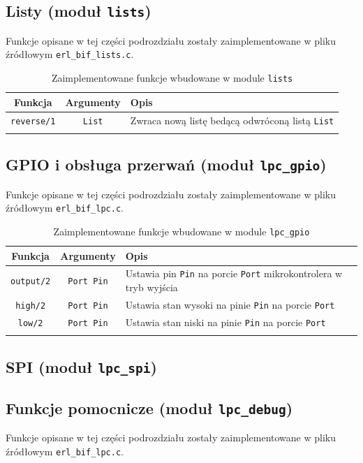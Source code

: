 \subsection{Listy (moduł \texttt{lists})}
\label{sub:bifLists}

Funkcje opisane w tej części podrozdziału zostały zaimplementowane w pliku źródłowym \texttt{erl\_bif\_lists.c}.

\begin{longtable}{|c|c|p{8cm}|}
\hline

Funkcja & Argumenty & Opis \\
\endfirsthead
\hline
\texttt{reverse/1} & \texttt{List} & Zwraca nową listę bedącą odwróconą listą \texttt{List} \\
\hline
\caption{Zaimplementowane funkcje wbudowane w module \texttt{lists}} 
\label{table:bifErlang} \\
\end{longtable}

\subsection{GPIO i obsługa przerwań (moduł \texttt{lpc\_gpio})}
\label{sub:bifGPIO}
Funkcje opisane w tej części podrozdziału zostały zaimplementowane w pliku źródłowym \texttt{erl\_bif\_lpc.c}.

\begin{longtable}{|c|c|p{10cm}|}
\hline

Funkcja & Argumenty & Opis \\
\endfirsthead
\hline
\texttt{output/2} & \texttt{Port Pin} & Ustawia pin \texttt{Pin} na porcie \texttt{Port} mikrokontrolera w tryb wyjścia\\
\hline
\texttt{high/2} & \texttt{Port Pin} & Ustawia stan wysoki na pinie \texttt{Pin} na porcie \texttt{Port} \\
\hline
\texttt{low/2} & \texttt{Port Pin} & Ustawia stan niski na pinie \texttt{Pin} na porcie \texttt{Port} \\
\hline
\caption{Zaimplementowane funkcje wbudowane w module \texttt{lpc\_gpio}} 
\label{table:bifGpio} \\
\end{longtable}


\subsection{SPI (moduł \texttt{lpc\_spi})}
\label{sub:bifSPI}


\subsection{Funkcje pomocnicze (moduł \texttt{lpc\_debug})}
\label{sub:bifDebug}
Funkcje opisane w tej części podrozdziału zostały zaimplementowane w pliku źródłowym \texttt{erl\_bif\_lpc.c}.

